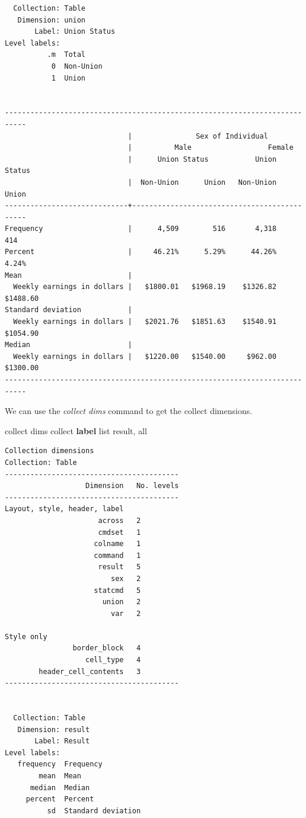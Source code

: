 \documentclass[
]{book}
\newenvironment{Shaded}{\begin{snugshade}}{\end{snugshade}}
\newcommand{\KeywordTok}[1]{\textcolor[rgb]{0.13,0.29,0.53}{\textbf{#1}}}
\newcommand{\NormalTok}[1]{#1}
\newcommand{\OtherTok}[1]{\textcolor[rgb]{0.56,0.35,0.01}{#1}}
\begin{document}
\begin{verbatim}
  Collection: Table
   Dimension: union
       Label: Union Status
Level labels:
          .m  Total
           0  Non-Union
           1  Union


---------------------------------------------------------------------------
                             |               Sex of Individual             
                             |          Male                  Female       
                             |      Union Status           Union Status    
                             |  Non-Union      Union   Non-Union      Union
-----------------------------+---------------------------------------------
Frequency                    |      4,509        516       4,318        414
Percent                      |     46.21%      5.29%      44.26%      4.24%
Mean                         |                                             
  Weekly earnings in dollars |   $1800.01   $1968.19    $1326.82   $1488.60
Standard deviation           |                                             
  Weekly earnings in dollars |   $2021.76   $1851.63    $1540.91   $1054.90
Median                       |                                             
  Weekly earnings in dollars |   $1220.00   $1540.00     $962.00   $1300.00
---------------------------------------------------------------------------
\end{verbatim}

We can use the \emph{collect dims} command to get the collect dimensions.

\begin{Shaded}
\begin{Highlighting}[]
\NormalTok{collect dims}
\NormalTok{collect }\KeywordTok{label} \OtherTok{list}\NormalTok{ result, }\OtherTok{all}
\end{Highlighting}
\end{Shaded}

\begin{verbatim}
Collection dimensions
Collection: Table
-----------------------------------------
                   Dimension   No. levels
-----------------------------------------
Layout, style, header, label
                      across   2         
                      cmdset   1         
                     colname   1         
                     command   1         
                      result   5         
                         sex   2         
                     statcmd   5         
                       union   2         
                         var   2         

Style only
                border_block   4         
                   cell_type   4         
        header_cell_contents   3         
-----------------------------------------


  Collection: Table
   Dimension: result
       Label: Result
Level labels:
   frequency  Frequency
        mean  Mean
      median  Median
     percent  Percent
          sd  Standard deviation
\end{verbatim}
\end{document}
